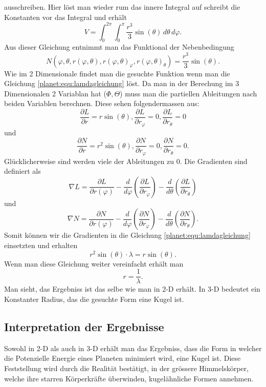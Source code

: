 ausschreiben.
Hier löst man wieder rum das innere Integral auf schreibt die Konstanten vor das Integral und erhält
\begin{equation*}
	V = \int_{0}^{2\pi}\int_{0}^{\pi}\frac{r^3}{3} \sin (\theta) \, d\theta \, d\varphi.
\end{equation*}
Aus dieser Gleichung entnimmt man das Funktional der Nebenbedingung
\begin{equation*}
	N(\varphi,\theta ,r(\varphi,\theta),r(\varphi,\theta)_\varphi,r(\varphi,\theta)_\theta) = \frac{r^3}{3} \sin (\theta).
\end{equation*}
Wie im 2 Dimensionale findet man die gesuchte Funktion wenn man die Gleichung \ref{planet:equ:lamdagleichung} löst.
Da man in der Berechung im 3 Dimensionalen 2 Variablan hat (\(\Phi,\Theta\)) muss man die partiellen Ableitungen nach beiden Variablen berechnen.
Diese sehen folgendermassen aus:
\begin{equation*}
	\frac{\partial L}{\partial r} = r  \sin (\theta) ,
	\frac{\partial L}{\partial r_\varphi} = 0 ,
	\frac{\partial L}{\partial r_\theta} = 0
\end{equation*}
und
\begin{equation*}
	\frac{\partial N}{\partial r} = r^2\sin (\theta) ,
	\frac{\partial N}{\partial r_\varphi} = 0 ,
	\frac{\partial N}{\partial r_\theta} = 0.
\end{equation*}
Glücklicherweise sind werden viele der Ableitungen zu 0.
Die Gradienten sind definiert als
\begin{equation*}
	\nabla L =  \frac{\partial L}{\partial r(\varphi)} 
	-\frac{d}{d\varphi}\left( \frac{\partial L}{\partial r_\varphi} \right)
	-\frac{d}{d\theta}\left( \frac{\partial L}{\partial r_\theta} \right)
\end{equation*}
und
\begin{equation*}
	\nabla N=  \frac{\partial N}{\partial r(\varphi)} 
	-\frac{d}{d\varphi}\left( \frac{\partial N}{\partial r_\varphi} \right)
	-\frac{d}{d\theta}\left( \frac{\partial N}{\partial r_\theta} \right).
\end{equation*}
Somit können wir die Gradienten in die Gleichung \ref{planet:equ:lamdagleichung} einsetzten und erhalten
\begin{equation*}
	r^2\sin (\theta) \cdot \lambda = r \sin (\theta).
\end{equation*}
Wenn man diese Gleichung weiter vereinfacht erhält man
\begin{equation*}
	r = \frac{1}{\lambda}.
\end{equation*}
Man sieht, das Ergebniss ist das selbe wie man in 2-D erhält.
In 3-D bedeutet ein Konstanter Radius, das die gesuchte Form eine Kugel ist.

\subsection{Interpretation der Ergebnisse}
Sowohl in 2-D als auch in 3-D erhält man das Ergebniss, dass die Form in welcher die Potenzielle Energie eines Planeten minimiert wird, eine Kugel ist.
Diese Feststellung wird durch die Realität bestätigt, in der grössere Himmelskörper, welche ihre starren Körperkräfte überwinden, kugelähnliche Formen annehmen.

